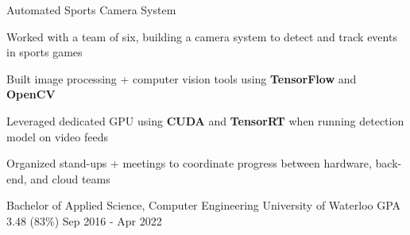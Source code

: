 \documentclass[11pt, a4paper]{awesome-cv}
\begin{document}
\begin{siderules2}
\begin{cventries}
    \cventry
        {\textit{}}
        {Automated Sports Camera System}
        {}
        {}
        {
          \begin{cvitems}
            \item {Worked with a team of six, building a camera system to detect and track events in sports games}
            \item {Built image processing + computer vision tools using \textbf{TensorFlow} and \textbf{OpenCV}}
            \item {Leveraged dedicated GPU using \textbf{CUDA} and \textbf{TensorRT} when running detection model on video feeds}
            \item {Organized stand-ups + meetings to coordinate progress between hardware, back-end, and cloud teams}
          \end{cvitems}
        }
\end{cventries}
\end{siderules2}
\begin{siderules3}
\begin{cventries}
    \education
    {\fontsize{11pt}{1.3em}\bodyfont\upshape\color{text}\selectfont Bachelor of Applied Science, Computer Engineering}
    {University of Waterloo}
    {GPA 3.48 (83\%)}
    {Sep 2016 - Apr 2022}
    {
      \begin{cvitems}
      \end{cvitems}
    }
\end{cventries}
\end{siderules3}
\end{document}
